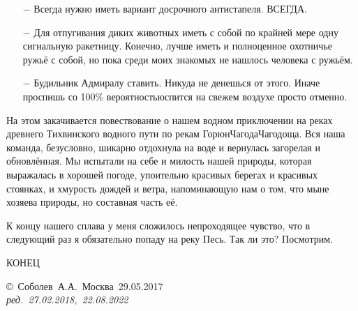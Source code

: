 \begin{enumerate}
\begin{enumerate}
		\item[$-$] Всегда нужно иметь вариант досрочного антистапеля. ВСЕГДА.
		\item[$-$] Для отпугивания диких животных иметь с собой по крайней мере одну сигнальную ракетницу. Конечно, лучше иметь и полноценное охотничье ружьё с собой, но пока среди моих знакомых не нашлось человека с ружьём.
		\item[$-$] Будильник Адмиралу ставить. Никуда не денешься от этого. Иначе проспишь  со 100\% вероятностью\mdash спится на свежем воздухе просто отменно.
	\end{enumerate}
\end{enumerate}	

На этом закачивается повествование о нашем водном приключении на реках древнего Тихвинского водного пути по рекам Горюн\sdash Чагода\sdash Чагодоща. Вся наша команда, безусловно, шикарно отдохнула на воде и вернулась загорелая и обновлённая. Мы испытали на себе и милость нашей природы, которая выражалась в хорошей погоде, упоительно красивых берегах и красивых стоянках, и хмурость дождей и ветра, напоминающую нам о том, что мы\mdash не хозяева природы, но составная часть её.

К концу нашего сплава у меня сложилось непроходящее чувство, что в следующий раз я обязательно попаду на реку Песь. Так ли это? Посмотрим.

\begin{center}
\end{center}

\begin{center}
	\Large {КОНЕЦ}
\end{center}
\vspace{\fill}
\begin{flushright}
	\copyright~Соболев~А.А.~Москва~29.05.2017\\
	\textit{ред.~27.02.2018,~22.08.2022}
\end{flushright}